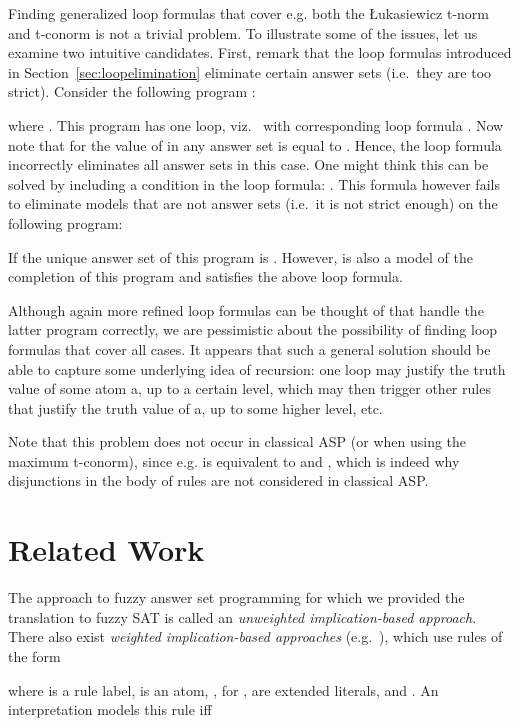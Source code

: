 \documentclass{tlp}
\begin{document}
Finding generalized loop formulas that cover e.g. both the \L ukasiewicz t-norm and t-conorm is not a trivial problem.  To illustrate some of the issues, let us examine two intuitive candidates. First, remark that the loop formulas introduced in Section~\ref{sec:loopelimination} eliminate certain answer sets (i.e.~they are too strict). Consider the following program :



\noindent where . This program has one loop, viz.~ with corresponding loop formula .
Now note that for  the value of  in any answer set is equal to . Hence, the loop formula incorrectly eliminates all answer sets in this case. One might think this can be solved by including a condition in the loop formula: . This formula however fails to eliminate models that are not answer sets (i.e.~it is not strict enough) on the following program:



If  the unique answer set of this program is . However,  is also a model of the completion
of this program and satisfies the above loop formula.

Although again more refined loop formulas can be thought of that handle the latter program correctly, we are pessimistic about the possibility of finding loop formulas that cover all cases.   It appears that such a general solution should be able to capture some underlying idea of recursion:  one loop may justify the truth value of some atom a, up to a certain level, which may then trigger other rules that justify the truth value of a, up to some higher level, etc.

Note that this problem does not occur in classical ASP (or when using the maximum t-conorm), since e.g.  is equivalent to  and , which is indeed why disjunctions in the body of rules are not considered in classical ASP. 

\section{Related Work}\label{sec:related}

The approach to fuzzy answer set programming for which we provided the translation to fuzzy SAT is called an \emph{unweighted implication-based approach}. There also exist \emph{weighted implication-based approaches} (e.g.~\cite{LukaStraccia07,madrid:existenceandunicity,MadridOjeda-Aciego-2008a,MadridAciego2009}), which use rules of the form
 
 where  is a rule label,  is an atom, , for , are extended literals, and . An interpretation  models this rule iff
 
\end{document}
